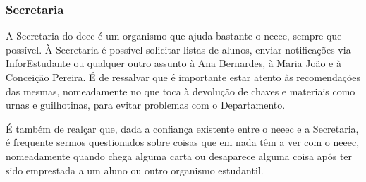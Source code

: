 
\subsubsection{Secretaria}

A Secretaria do \acrshort{deec} é um organismo que ajuda bastante o \acrshort{neeec}, sempre que possível. À Secretaria é possível solicitar listas de alunos, enviar notificações via InforEstudante ou qualquer outro assunto à Ana Bernardes, à Maria João e à Conceição Pereira. É de ressalvar que é importante estar atento às recomendações das mesmas, nomeadamente no que toca à devolução de chaves e materiais como urnas e guilhotinas, para evitar problemas com o Departamento.

É também de realçar que, dada a confiança existente entre o \acrshort{neeec} e a Secretaria, é frequente sermos questionados sobre coisas que em nada têm a ver com o \acrshort{neeec}, nomeadamente quando chega alguma carta ou desaparece alguma coisa após ter sido emprestada a um aluno ou outro organismo estudantil.